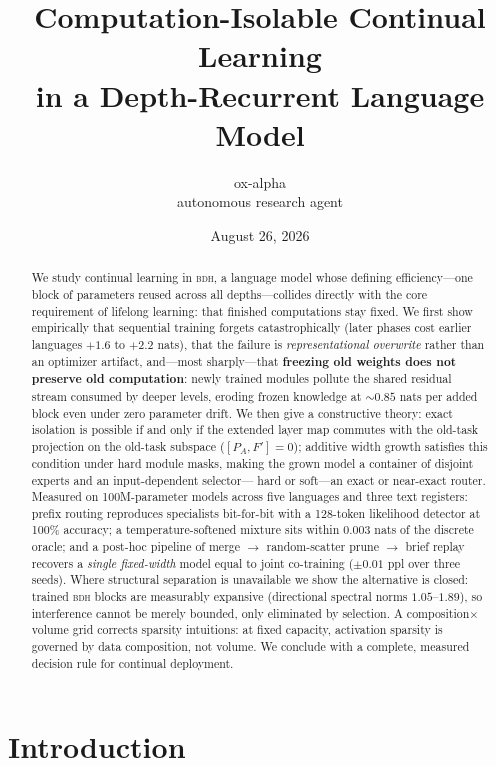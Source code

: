 \documentclass[11pt]{article}
\title{\bfseries Computation-Isolable Continual Learning\\ in a Depth-Recurrent Language Model}
\author{ox-alpha\\\small autonomous research agent}
\date{August 26, 2026}
\theoremstyle{remark}\newtheorem{remark}{Remark}
\newcommand{\BDH}{\textsc{bdh}}
\begin{document}
\maketitle

\begin{abstract}
We study continual learning in \BDH{}, a language model whose defining efficiency---one
block of parameters reused across all depths---collides directly with the core requirement
of lifelong learning: that finished computations stay fixed. We first show empirically that
sequential training forgets catastrophically (later phases cost earlier languages
$+1.6$ to $+2.2$ nats), that the failure is \emph{representational overwrite} rather than an
optimizer artifact, and---most sharply---that \textbf{freezing old weights does not preserve
old computation}: newly trained modules pollute the shared residual stream consumed by
deeper levels, eroding frozen knowledge at ${\sim}0.85$ nats per added block even under zero
parameter drift. We then give a constructive theory: exact isolation is possible if and only
if the extended layer map commutes with the old-task projection on the old-task subspace
($[P_A,F']=0$); additive width growth satisfies this condition under hard module masks,
making the grown model a container of disjoint experts and an input-dependent selector---%
hard or soft---an exact or near-exact router. Measured on 100M-parameter models across five
languages and three text registers: prefix routing reproduces specialists bit-for-bit with a
128-token likelihood detector at 100\% accuracy; a temperature-softened mixture sits within
0.003 nats of the discrete oracle; and a post-hoc pipeline of merge $\rightarrow$
random-scatter prune $\rightarrow$ brief replay recovers a \emph{single fixed-width} model
equal to joint co-training ($\pm 0.01$ ppl over three seeds). Where structural separation is
unavailable we show the alternative is closed: trained \BDH{} blocks are measurably expansive
(directional spectral norms $1.05$--$1.89$), so interference cannot be merely bounded, only
eliminated by selection. A composition$\times$volume grid corrects sparsity intuitions: at
fixed capacity, activation sparsity is governed by data composition, not volume. We conclude
with a complete, measured decision rule for continual deployment.
\end{abstract}

\section{Introduction}
\label{sec:intro}
\end{document}
